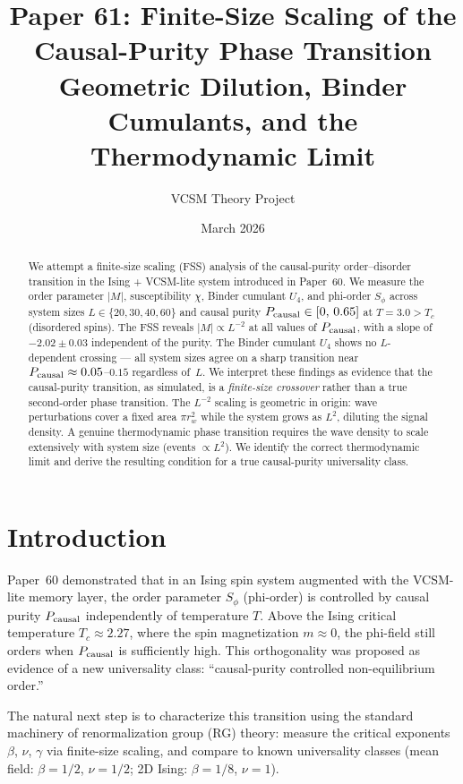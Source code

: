 \documentclass[12pt,a4paper]{article}
\title{\textbf{Paper 61: Finite-Size Scaling of the Causal-Purity Phase Transition\\
\large Geometric Dilution, Binder Cumulants, and the Thermodynamic Limit}}
\author{VCSM Theory Project}
\date{March 2026}
\begin{document}
\maketitle

\begin{abstract}
We attempt a finite-size scaling (FSS) analysis of the causal-purity order--disorder
transition in the Ising + VCSM-lite system introduced in Paper~60.
We measure the order parameter $|M|$, susceptibility $\chi$, Binder cumulant $U_4$,
and phi-order $S_\phi$ across system sizes $L \in \{20, 30, 40, 60\}$ and causal
purity $P_{\rm causal} \in [0,\, 0.65]$ at $T = 3.0 > T_c$ (disordered spins).
The FSS reveals $|M| \propto L^{-2}$ at all values of $P_{\rm causal}$,
with a slope of $-2.02 \pm 0.03$ independent of the purity.
The Binder cumulant $U_4$ shows no $L$-dependent crossing — all system sizes
agree on a sharp transition near $P_{\rm causal} \approx 0.05$--$0.15$ regardless of~$L$.
We interpret these findings as evidence that the causal-purity transition, as simulated,
is a \emph{finite-size crossover} rather than a true second-order phase transition.
The $L^{-2}$ scaling is geometric in origin: wave perturbations cover a fixed area
$\pi r_w^2$ while the system grows as $L^2$, diluting the signal density.
A genuine thermodynamic phase transition requires the wave density to scale
extensively with system size (events $\propto L^2$).
We identify the correct thermodynamic limit and derive the resulting condition
for a true causal-purity universality class.
\end{abstract}

\section{Introduction}
\label{sec:intro}

Paper~60 demonstrated that in an Ising spin system augmented with the VCSM-lite
memory layer, the order parameter $S_\phi$ (phi-order) is controlled by causal
purity $P_{\rm causal}$ independently of temperature $T$.
Above the Ising critical temperature $T_c \approx 2.27$, where the spin
magnetization $m \approx 0$, the phi-field still orders when $P_{\rm causal}$
is sufficiently high.
This orthogonality was proposed as evidence of a new universality class:
``causal-purity controlled non-equilibrium order.''

The natural next step is to characterize this transition using the standard
machinery of renormalization group (RG) theory:
measure the critical exponents $\beta$, $\nu$, $\gamma$ via finite-size scaling,
and compare to known universality classes (mean field: $\beta{=}1/2$, $\nu{=}1/2$;
2D Ising: $\beta{=}1/8$, $\nu{=}1$).
\end{document}
